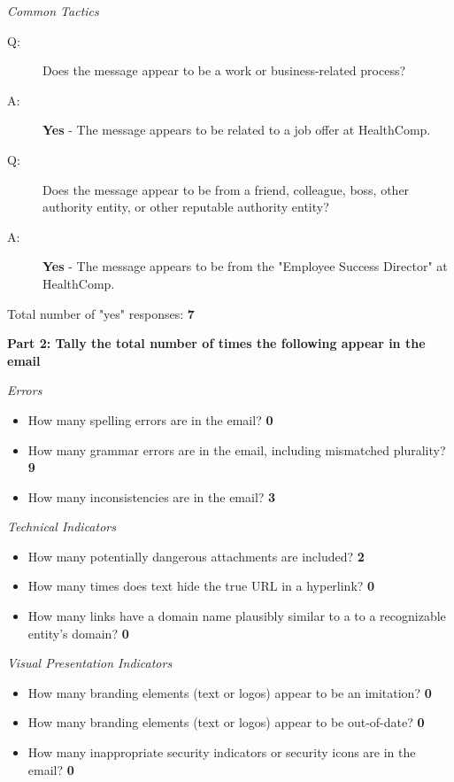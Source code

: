 \begin{fullwidth}
\textit{Common Tactics}
\begin{description}
    \item[Q:] Does the message appear to be a work or business-related process?
    \item[A:] \textbf{Yes} - The message appears to be related to a job offer at HealthComp.
    \item[Q:] Does the message appear to be from a friend, colleague, boss, other authority
entity, or other reputable authority entity?
    \item[A:] \textbf{Yes} - The message appears to be from the "Employee Success Director" at HealthComp.
\end{description}

Total number of "yes" responses: \textbf{7}

\textbf{Part 2: Tally the total number of times the following appear in the email}

\textit{Errors}
\begin{itemize}
    \item How many spelling errors are in the email? \textbf{0}
    \item How many grammar errors are in the email, including mismatched plurality? \textbf{9}
    \item How many inconsistencies are in the email? \textbf{3}
\end{itemize}

\textit{Technical Indicators}
\begin{itemize}
    \item How many potentially dangerous attachments are included? \textbf{2}
    \item How many times does text hide the true URL in a hyperlink? \textbf{0}
    \item How many links have a domain name plausibly similar to a to a recognizable
entity's domain? \textbf{0}
\end{itemize}

\textit{Visual Presentation Indicators}
\begin{itemize}
    \item How many branding elements (text or logos) appear to be an imitation? \textbf{0}
    \item How many branding elements (text or logos) appear to be out-of-date? \textbf{0}
    \item How many inappropriate security indicators or security icons are in the
email? \textbf{0}
\end{itemize}


\end{fullwidth}
